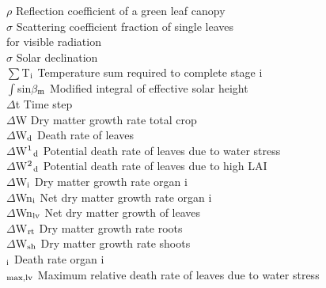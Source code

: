 \documentclass[11pt]{article}
\begin{document}
\begin{tabbing}
$\rho$\> \> Reflection coefficient of a green leaf canopy\> \> \> \> \> \> \> \> [-]\\
$\sigma$\> \> Scattering coefficient fraction of single leaves \\
\>\> for visible radiation\> \> \> \> \> \> \> \> [-]\\
$\sigma$\> \> Solar declination\> \> \> \> \> \> \> \> [degrees]\\
$\sum$T$_{{\rm i}}$\> \> Temperature sum required to complete stage i\> \> \> \> \> \> \> \> [\degrees C d]\\
$\int$sin$\beta$$_{{\rm m}}$\> \> Modified integral of effective solar height\> \> \> \> \> \> \> \> [s]\\
$\Delta$t\> \> Time step\> \> \> \> \> \> \> \> [d]\\
$\Delta$W\> \> Dry matter growth rate total crop\> \> \> \> \> \> \> \> [kg ha$^{{\rm -1}}$ d$^{{\rm -1}}$]\\
$\Delta$W$_{{\rm d}}$\> \> Death rate of leaves \> \> \> \> \> \> \> \> [kg ha$^{{\rm -1}}$ d$^{{\rm -1}}$]\\
$\Delta$W$^{{\rm 1}}$$_{{\rm d}}$\> \> Potential death rate of leaves due to water stress\> \> \> \> \> \> \> \> [kg ha$^{{\rm -1}}$ d$^{{\rm -1}}$]\\
$\Delta$W$^{{\rm 2}}$$_{{\rm d}}$\> \> Potential death rate of leaves due to high LAI\> \> \> \> \> \> \> \> [kg ha$^{{\rm -1}}$ d$^{{\rm -1}}$]\\
$\Delta$W$_{{\rm i}}$\> \> Dry matter growth rate organ i\> \> \> \> \> \> \> \> [kg ha$^{{\rm -1}}$ d$^{{\rm -1}}$]\\
$\Delta$Wn$_{{\rm i}}$\> \> Net dry matter growth rate organ i\> \> \> \> \> \> \> \> [kg ha$^{{\rm -1}}$ d$^{{\rm -1}}$]\\
$\Delta$Wn$_{{\rm lv}}$\> \> Net dry matter growth of leaves \> \> \> \> \> \> \> \> [kg ha$^{{\rm -1}}$ d$^{{\rm -1}}$]\\
$\Delta$W$_{{\rm rt}}$\> \> Dry matter growth rate roots\> \> \> \> \> \> \> \> [kg ha$^{{\rm -1}}$ d$^{{\rm -1}}$]\\
$\Delta$W$_{{\rm sh}}$\> \> Dry matter growth rate shoots\> \> \> \> \> \> \> \> [kg ha$^{{\rm -1}}$ d$^{{\rm -1}}$]\\
\dag $_{{\rm i}}$\> \> Death rate organ i\> \> \> \> \> \> \> \> [kg kg$^{{\rm -1}}$ d$^{{\rm -1}}$]\\
\dag $_{{\rm max,lv}}$\> \> Maximum relative death rate of leaves due to water stress\> \> \> \> \> \> \> \> [kg kg$^{{\rm -1}}$ d$^{{\rm -1}}$]\\
$$
\end{tabbing}
\end{document}
